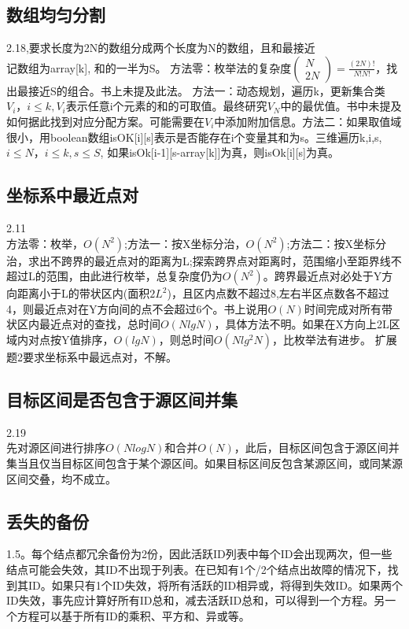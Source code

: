 \subsection{数组均匀分割}
\cite{bop}2.18,要求长度为2N的数组分成两个长度为N的数组，且和最接近\\记数组为array[k], 和的一半为S。
方法零：枚举法的复杂度$\left( \begin{array}{c} N \\ 2N \end{array} \right) = \frac{(2N)!}{N!N!}$，找出最接近S的组合。书上未提及此法。
    方法一：动态规划，遍历k，更新集合类$V_i，i \le k, V_i$表示任意i个元素的和的可取值。最终研究$V_N$中的最优值。书中未提及如何据此找到对应分配方案。可能需要在$V_i$中添加附加信息。方法二：如果取值域很小，用boolean数组isOK[i][s]表示是否能存在i个变量其和为s。三维遍历k,i,s, $i \le N，i \le k, s \le S$, 如果isOk[i-1][s-array[k]]为真，则isOk[i][s]为真。



\subsection{坐标系中最近点对}
\cite{bop}2.11\\
方法零：枚举，$O(N^2)$;方法一：按X坐标分治，$O(N^2)$;方法二：按X坐标分治，求出不跨界的最近点对的距离为L;探索跨界点对距离时，范围缩小至距界线不超过L的范围，由此进行枚举，总复杂度仍为$O(N^2)$。跨界最近点对必处于Y方向距离小于L的带状区内(面积$2L^2$)，且区内点数不超过8,左右半区点数各不超过4，则最近点对在Y方向间的点不会超过6个。书上说用$O(N)$时间完成对所有带状区内最近点对的查找，总时间$O(NlgN)$，具体方法不明。如果在X方向上2L区域内对点按Y值排序，$O(lgN)$，则总时间$O(Nlg^{2}N)$，比枚举法有进步。
扩展题2要求坐标系中最远点对，不解。

\subsection{目标区间是否包含于源区间并集}
\cite{bop}2.19\\
先对源区间进行排序$O(NlogN)$和合并$O(N)$，此后，目标区间包含于源区间并集当且仅当目标区间包含于某个源区间。如果目标区间反包含某源区间，或同某源区间交叠，均不成立。

\subsection{丢失的备份}
\cite{bop}1.5。每个结点都冗余备份为2份，因此活跃ID列表中每个ID会出现两次，但一些结点可能会失效，其ID不出现于列表。在已知有1个/2个结点出故障的情况下，找到其ID。如果只有1个ID失效，将所有活跃的ID相异或，将得到失效ID。如果两个ID失效，事先应计算好所有ID总和，减去活跃ID总和，可以得到一个方程。另一个方程可以基于所有ID的乘积、平方和、异或等。
